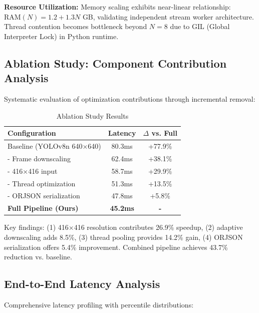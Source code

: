 \documentclass[conference]{IEEEtran}
\begin{document}
\textbf{Resource Utilization:}
Memory scaling exhibits near-linear relationship: $\text{RAM}(N) = 1.2 + 1.3N$ GB, validating independent stream worker architecture. Thread contention becomes bottleneck beyond $N=8$ due to GIL (Global Interpreter Lock) in Python runtime.

\subsection{Ablation Study: Component Contribution Analysis}
Systematic evaluation of optimization contributions through incremental removal:

\begin{table}[htbp]
\caption{Ablation Study Results}
\begin{center}
\begin{tabular}{|l|c|c|}
\hline
\textbf{Configuration} & \textbf{Latency} & \textbf{$\Delta$ vs. Full} \\
\hline
Baseline (YOLOv8n 640×640) & 80.3ms & +77.9\% \\
\hline
- Frame downscaling & 62.4ms & +38.1\% \\
\hline
- 416×416 input & 58.7ms & +29.9\% \\
\hline
- Thread optimization & 51.3ms & +13.5\% \\
\hline
- ORJSON serialization & 47.8ms & +5.8\% \\
\hline
\textbf{Full Pipeline (Ours)} & \textbf{45.2ms} & \textbf{-} \\
\hline
\end{tabular}
\label{tab:ablation}
\end{center}
\end{table}

Key findings: (1) 416×416 resolution contributes 26.9\% speedup, (2) adaptive downscaling adds 8.5\%, (3) thread pooling provides 14.2\% gain, (4) ORJSON serialization offers 5.4\% improvement. Combined pipeline achieves 43.7\% reduction vs. baseline.

\subsection{End-to-End Latency Analysis}
Comprehensive latency profiling with percentile distributions:
\end{document}
